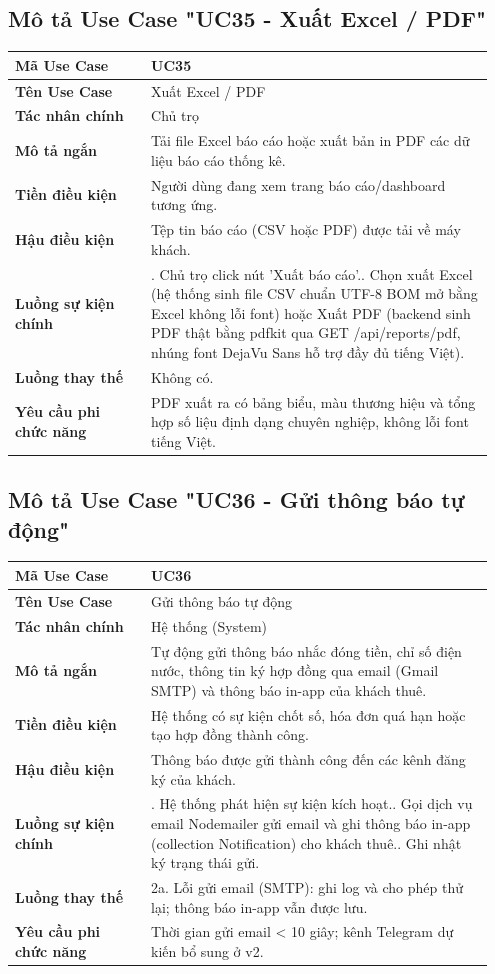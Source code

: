 \documentclass[a4paper,oneside]{report}
\begin{document}
\subsection{Mô tả Use Case "UC35 - Xuất Excel / PDF"}

\begin{longtable}[]{@{}>{\RaggedRight\arraybackslash}p{0.27\linewidth}>{\RaggedRight\arraybackslash}p{0.68\linewidth}@{}}
\toprule
\textbf{Mã Use Case} & UC35\tabularnewline
\midrule
\endhead
\textbf{Tên Use Case} & Xuất Excel / PDF\tabularnewline
\textbf{Tác nhân chính} & Chủ trọ\tabularnewline
\textbf{Mô tả ngắn} & Tải file Excel báo cáo hoặc xuất bản in PDF các dữ
liệu báo cáo thống kê.\tabularnewline
\textbf{Tiền điều kiện} & Người dùng đang xem trang báo cáo/dashboard
tương ứng.\tabularnewline
\textbf{Hậu điều kiện} & Tệp tin báo cáo (CSV hoặc PDF) được tải về máy
khách.\tabularnewline
\textbf{Luồng sự kiện chính} & 1. Chủ trọ click nút
'Xuất báo cáo'.\newline 2. Chọn xuất Excel (hệ thống sinh file CSV
chuẩn UTF-8 BOM mở bằng Excel không lỗi font) hoặc Xuất PDF (backend
sinh PDF thật bằng pdfkit qua GET /api/reports/pdf, nhúng font DejaVu
Sans hỗ trợ đầy đủ tiếng Việt).\tabularnewline
\textbf{Luồng thay thế} & Không có.\tabularnewline
\textbf{Yêu cầu phi chức năng} & PDF xuất ra có bảng biểu, màu thương
hiệu và tổng hợp số liệu định dạng chuyên nghiệp, không lỗi font tiếng
Việt.\tabularnewline
\bottomrule
\end{longtable}

\subsection{Mô tả Use Case "UC36 - Gửi thông báo tự động"}

\begin{longtable}[]{@{}>{\RaggedRight\arraybackslash}p{0.27\linewidth}>{\RaggedRight\arraybackslash}p{0.68\linewidth}@{}}
\toprule
\textbf{Mã Use Case} & UC36\tabularnewline
\midrule
\endhead
\textbf{Tên Use Case} & Gửi thông báo tự động\tabularnewline
\textbf{Tác nhân chính} & Hệ thống (System)\tabularnewline
\textbf{Mô tả ngắn} & Tự động gửi thông báo nhắc đóng tiền, chỉ số điện
nước, thông tin ký hợp đồng qua email (Gmail SMTP) và thông báo in-app
của khách thuê.\tabularnewline
\textbf{Tiền điều kiện} & Hệ thống có sự kiện chốt số, hóa đơn quá hạn
hoặc tạo hợp đồng thành công.\tabularnewline
\textbf{Hậu điều kiện} & Thông báo được gửi thành công đến các kênh đăng
ký của khách.\tabularnewline
\textbf{Luồng sự kiện chính} & 1. Hệ thống phát hiện
sự kiện kích hoạt.\newline 2. Gọi dịch vụ email Nodemailer gửi
email và ghi thông báo in-app (collection Notification) cho khách
thuê.\newline 3. Ghi nhật ký trạng thái gửi.\tabularnewline
\textbf{Luồng thay thế} & 2a. Lỗi gửi email (SMTP): ghi log và cho phép
thử lại; thông báo in-app vẫn được lưu.\tabularnewline
\textbf{Yêu cầu phi chức năng} & Thời gian gửi email \textless{} 10
giây; kênh Telegram dự kiến bổ sung ở v2.\tabularnewline
\bottomrule
\end{longtable}
\end{document}
